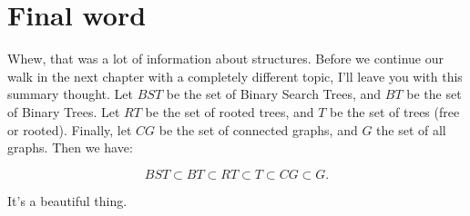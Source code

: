 \section{Final word}

Whew, that was a lot of information about structures. Before we continue
our walk in the next chapter with a completely different topic, I'll leave
you with this summary thought. Let $BST$ be the set of Binary Search Trees,
and $BT$ be the set of Binary Trees. Let $RT$ be the set of rooted trees,
and $T$ be the set of trees (free or rooted). Finally, let $CG$ be the set
of connected graphs, and $G$ the set of all graphs. Then we have:

\[
BST \subset BT \subset RT \subset T \subset CG \subset G.
\]

It's a beautiful thing.
